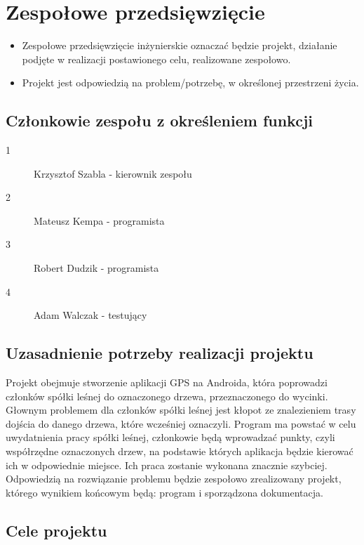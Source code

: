 \flushleft \chapter{Zespołowe przedsięwzięcie}

\begin{itemize}
\item Zespołowe przedsięwzięcie inżynierskie oznaczać będzie projekt, działanie podjęte w realizacji postawionego celu, realizowane zespołowo.

\item Projekt jest odpowiedzią na problem/potrzebę, w określonej przestrzeni życia.
\end{itemize}

\section{Członkowie zespołu z określeniem funkcji}
\begin{description}
\item[1] Krzysztof Szabla - kierownik zespołu
\item[2] Mateusz Kempa - programista 
\item[3] Robert Dudzik - programista
\item[4] Adam Walczak - testujący
\end{description}

\section{Uzasadnienie potrzeby realizacji projektu}

Projekt obejmuje stworzenie aplikacji GPS na Androida, która poprowadzi członków spółki leśnej do oznaczonego drzewa, przeznaczonego do wycinki. Głownym problemem dla członków spółki leśnej jest kłopot ze znalezieniem trasy dojścia do danego drzewa, które wcześniej oznaczyli. Program ma powstać w celu uwydatnienia pracy spółki leśnej, członkowie będą wprowadzać punkty, czyli współrzędne oznaczonych drzew,  na podstawie których aplikacja będzie kierować ich w odpowiednie miejsce. Ich praca zostanie wykonana znacznie szybciej. Odpowiedzią na  rozwiązanie problemu będzie zespołowo zrealizowany projekt, którego wynikiem końcowym będą: program i sporządzona dokumentacja.

\section{Cele projektu} 


